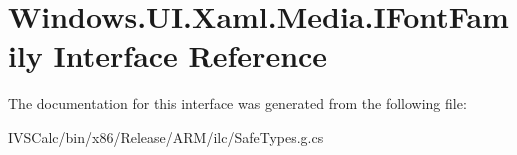 \hypertarget{interface_windows_1_1_u_i_1_1_xaml_1_1_media_1_1_i_font_family}{}\section{Windows.\+U\+I.\+Xaml.\+Media.\+I\+Font\+Family Interface Reference}
\label{interface_windows_1_1_u_i_1_1_xaml_1_1_media_1_1_i_font_family}


The documentation for this interface was generated from the following file\+:\begin{DoxyCompactItemize}
\item 
I\+V\+S\+Calc/bin/x86/\+Release/\+A\+R\+M/ilc/Safe\+Types.\+g.\+cs\end{DoxyCompactItemize}
